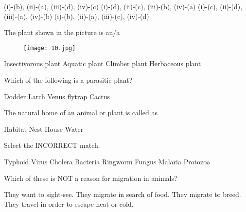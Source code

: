 \begin{questions}
    \begin{randomizechoices}
        \CorrectChoice (i)-(b), (ii)-(a), (iii)-(d), (iv)-(c)
        \choice (i)-(d), (ii)-(c), (iii)-(b), (iv)-(a)
        \choice (i)-(c), (ii)-(d), (iii)-(a), (iv)-(b)
        \choice (i)-(b), (ii)-(a), (iii)-(c), (iv)-(d)
    \end{randomizechoices}

    \question The plant shown in the picture is an/a

    \begin{figure}[h!]
        \centering
        \texttt{[image: 10.jpg]}
      \end{figure}

    \begin{randomizeoneparchoices}
        \CorrectChoice Insectivorous plant
        \choice Aquatic plant
        \choice Climber plant
        \choice Herbaceous plant
    \end{randomizeoneparchoices}

    \question Which of the following is a parasitic plant?

    \begin{randomizeoneparchoices}
        \CorrectChoice Dodder
        \choice Larch
        \choice Venus flytrap
        \choice Cactus
    \end{randomizeoneparchoices}

    \question The natural home of an animal or plant is called as

    \begin{randomizeoneparchoices}
        \CorrectChoice Habitat
        \choice Nest
        \choice House
        \choice Water
    \end{randomizeoneparchoices}

    \question Select the INCORRECT match.

    \begin{randomizechoices}
        \CorrectChoice Typhoid \textemdash Virus
        \choice Cholera \textemdash Bacteria
        \choice Ringworm \textemdash Fungus
        \choice Malaria \textemdash Protozoa
    \end{randomizechoices}

    \question Which of these is NOT a reason for migration in animals?

    \begin{randomizechoices}
        \CorrectChoice They want to sight-see.
        \choice They migrate in search of food.
        \choice They migrate to breed.
        \choice They travel in order to escape heat or cold.
    \end{randomizechoices}


\end{questions}
